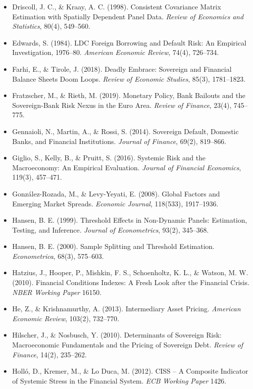 \documentclass[5p,times,twocolumn,authoryear]{elsarticle}
\begin{document}
\begin{itemize}
    \item Driscoll, J. C., \& Kraay, A. C. (1998). Consistent Covariance Matrix Estimation with Spatially Dependent Panel Data. \textit{Review of Economics and Statistics}, 80(4), 549–560.
    \item Edwards, S. (1984). LDC Foreign Borrowing and Default Risk: An Empirical Investigation, 1976–80. \textit{American Economic Review}, 74(4), 726–734.
    \item Farhi, E., \& Tirole, J. (2018). Deadly Embrace: Sovereign and Financial Balance Sheets Doom Loops. \textit{Review of Economic Studies}, 85(3), 1781–1823.
    \item Fratzscher, M., \& Rieth, M. (2019). Monetary Policy, Bank Bailouts and the Sovereign-Bank Risk Nexus in the Euro Area. \textit{Review of Finance}, 23(4), 745–775.
    \item Gennaioli, N., Martin, A., \& Rossi, S. (2014). Sovereign Default, Domestic Banks, and Financial Institutions. \textit{Journal of Finance}, 69(2), 819–866.
    \item Giglio, S., Kelly, B., \& Pruitt, S. (2016). Systemic Risk and the Macroeconomy: An Empirical Evaluation. \textit{Journal of Financial Economics}, 119(3), 457–471.
    \item González-Rozada, M., \& Levy-Yeyati, E. (2008). Global Factors and Emerging Market Spreads. \textit{Economic Journal}, 118(533), 1917–1936.
    \item Hansen, B. E. (1999). Threshold Effects in Non-Dynamic Panels: Estimation, Testing, and Inference. \textit{Journal of Econometrics}, 93(2), 345–368.
    \item Hansen, B. E. (2000). Sample Splitting and Threshold Estimation. \textit{Econometrica}, 68(3), 575–603.
    \item Hatzius, J., Hooper, P., Mishkin, F. S., Schoenholtz, K. L., \& Watson, M. W. (2010). Financial Conditions Indexes: A Fresh Look after the Financial Crisis. \textit{NBER Working Paper} 16150.
    \item He, Z., \& Krishnamurthy, A. (2013). Intermediary Asset Pricing. \textit{American Economic Review}, 103(2), 732–770.
    \item Hilscher, J., \& Nosbusch, Y. (2010). Determinants of Sovereign Risk: Macroeconomic Fundamentals and the Pricing of Sovereign Debt. \textit{Review of Finance}, 14(2), 235–262.
    \item Holló, D., Kremer, M., \& Lo Duca, M. (2012). CISS – A Composite Indicator of Systemic Stress in the Financial System. \textit{ECB Working Paper} 1426.

\end{itemize}
\end{document}
